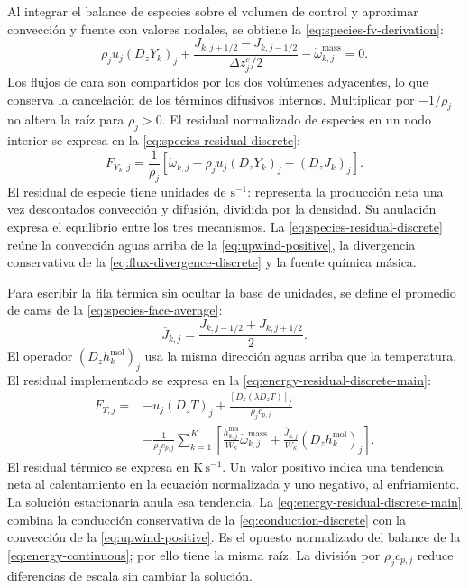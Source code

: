 \documentclass[12pt,a4paper,twoside,openany]{book}
\begin{document}
Al integrar el balance de especies sobre el volumen de control y aproximar
convección y fuente con valores nodales, se obtiene la
\cref{eq:species-fv-derivation}:
\begin{equation}
 \rho_j u_j(D_zY_k)_j+
 \frac{J_{k,j+1/2}-J_{k,j-1/2}}{\Delta z_j^c/2}
 -\dot\omega_{k,j}^{\mathrm{mass}}=0.
 \label{eq:species-fv-derivation}
\end{equation}
Los flujos de cara son compartidos por los dos volúmenes adyacentes, lo que
conserva la cancelación de los términos difusivos internos.
Multiplicar por \(-1/\rho_j\) no altera la raíz para \(\rho_j>0\).
El residual normalizado de especies en un nodo interior se expresa en la \cref{eq:species-residual-discrete}:
\begin{equation}
  F_{Y_k,j}=\frac{1}{\rho_j}\left[
  \dot\omega_{k,j}-\rho_j u_j(D_zY_k)_j
  -(D_zJ_k)_j\right].
  \label{eq:species-residual-discrete}
\end{equation}
El residual de especie tiene unidades de \(\mathrm{s^{-1}}\): representa
la producción neta una vez descontados convección y difusión, dividida por
la densidad. Su anulación expresa el equilibrio entre los tres mecanismos.
La \cref{eq:species-residual-discrete} reúne la convección aguas arriba de la \cref{eq:upwind-positive}, la divergencia conservativa de la \cref{eq:flux-divergence-discrete} y la fuente química másica.

Para escribir la fila térmica sin ocultar la base de unidades, se define
el promedio de caras de la \cref{eq:species-face-average}:
\begin{equation}
 \overline J_{k,j}=\frac{J_{k,j-1/2}+J_{k,j+1/2}}{2}.
 \label{eq:species-face-average}
\end{equation}
El operador
\((D_zh_k^{\mathrm{mol}})_j\) usa la misma dirección aguas arriba que la
temperatura. El residual implementado se expresa en la \cref{eq:energy-residual-discrete-main}:
\begin{equation}
 \begin{aligned}
  F_{T,j}={}&-u_j(D_zT)_j
  +\frac{[D_z(\lambda D_zT)]_j}{\rho_jc_{p,j}}\\
  &-\frac{1}{\rho_jc_{p,j}}\sum_{k=1}^{K}\left[
    \frac{h_{k,j}^{\mathrm{mol}}}{W_k}\dot\omega_{k,j}^{\mathrm{mass}}
    +\frac{\overline J_{k,j}}{W_k}(D_zh_k^{\mathrm{mol}})_j
  \right].
 \end{aligned}
  \label{eq:energy-residual-discrete-main}
\end{equation}
El residual térmico se expresa en \(\mathrm{K\,s^{-1}}\). Un valor positivo
indica una tendencia neta al calentamiento en la ecuación normalizada y uno
negativo, al enfriamiento. La solución estacionaria anula esa tendencia.
La \cref{eq:energy-residual-discrete-main} combina la conducción conservativa de la \cref{eq:conduction-discrete} con la convección de la \cref{eq:upwind-positive}. Es el opuesto normalizado del balance de la \cref{eq:energy-continuous}; por ello tiene la misma raíz. La división por
\(\rho_jc_{p,j}\) reduce diferencias de escala sin cambiar la solución.
\end{document}
